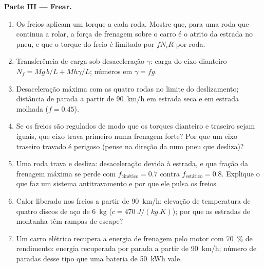 \begin{problem}
\medskip
\noindent\textbf{Parte III --- Frear.}
\begin{enumerate}[resume]
  \item Os freios aplicam um torque a cada roda. Mostre que, para uma roda
        que continua a rolar, a força de frenagem sobre o carro é o
        atrito da estrada no pneu, e que o torque do freio é
        limitado por $fN_iR$ por roda.
  \item Transferência de carga sob desaceleração $\gamma$: carga do eixo dianteiro
        $N_f = Mg\,b/L + Mh\gamma/L$; números em $\gamma = fg$.
  \item Desaceleração máxima com as quatro rodas no limite do
        deslizamento; distância de parada a partir de \qty{90}{km/h} em estrada seca e
        em estrada molhada ($f = 0.45$).
  \item Se os freios são regulados de modo que os torques dianteiro e traseiro sejam iguais,
        que eixo trava primeiro numa frenagem forte? Por que um eixo traseiro
        travado é perigoso (pense na direção da 
        num pneu que desliza)?
  \item Uma roda trava e desliza: desaceleração devida à estrada, e que
        fração da frenagem máxima se perde com $f_{\text{cinético}} =
        0.7$ contra $f_{\text{estático}} = 0.8$. Explique o que faz um sistema
        antitravamento e por que ele pulsa os freios.
  \item Calor liberado nos freios a partir de \qty{90}{km/h}; elevação de
        temperatura de quatro discos de aço de \qty{6}{kg} ($c = \qty{470}{J/(kg.K)}$);
        por que as estradas de montanha têm rampas de escape?
  \item Um carro elétrico recupera a energia de frenagem pelo motor com
        \qty{70}{\%} de rendimento: energia recuperada por parada a partir de
        \qty{90}{km/h}; número de paradas desse tipo que uma bateria de \qty{50}{kWh}
        vale.
\end{enumerate}


\end{problem}
